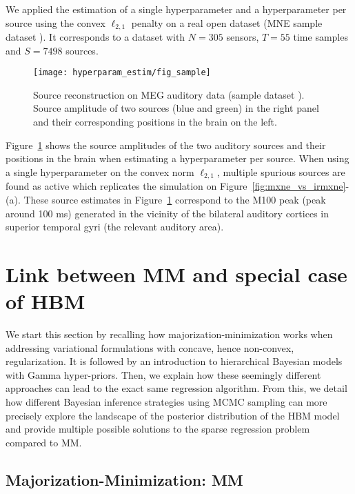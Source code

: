 We applied the estimation of a single hyperparameter and a hyperparameter per source using the convex $\ell_{2,1}$ penalty on a real open dataset (MNE sample dataset \cite{mne}). It corresponds to a dataset with $N=305$ sensors, $T=55$ time samples and $S=7498$ sources. 
\begin{figure}
\texttt{[image: hyperparam\_estim/fig\_sample]}
    \caption{Source reconstruction on MEG auditory data (sample dataset \cite{mne}). Source amplitude of two sources (blue and green) in the right panel and their corresponding positions in the brain on the left. 
    }
    \label{fig:sample_data}
\end{figure}
Figure~\ref{fig:sample_data} shows the source amplitudes of the two auditory sources and their positions in the brain when estimating a hyperparameter per source. When using a single hyperparameter on the convex norm $\ell_{2,1}$, multiple spurious sources are found as active which replicates the simulation on Figure~\ref{fig:mxne_vs_irmxne}-(a). These source estimates in Figure~\ref{fig:sample_data} correspond to the M100 peak (peak around 100 ms) generated in the vicinity of the bilateral auditory cortices in superior temporal gyri (the relevant auditory area).


\section{Link between MM and special case of HBM}\label{link_hbm_mm}

We start this section by recalling how majorization-minimization works
when addressing variational formulations with concave, hence non-convex, regularization. It is followed by an introduction to hierarchical Bayesian models with Gamma hyper-priors. Then, we explain how these seemingly different approaches can lead to the exact same regression algorithm.
From this, we detail how different Bayesian inference strategies using MCMC
sampling can more precisely explore the landscape of the posterior distribution of the HBM model and provide multiple possible solutions to the sparse regression problem compared to MM.

\subsection{Majorization-Minimization: MM}
\label{section:MM}

